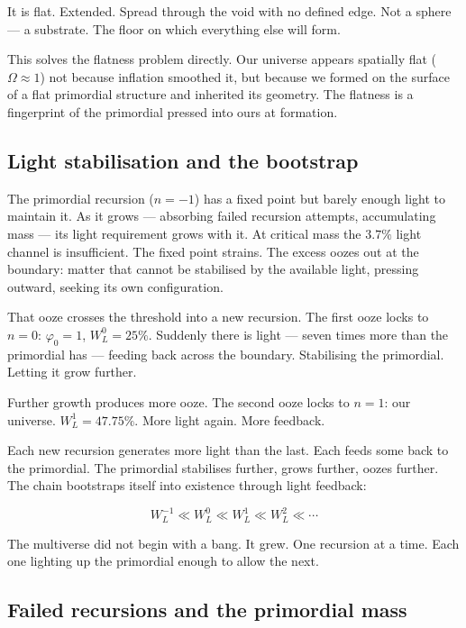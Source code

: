 \documentclass[prd,twocolumn,preprintnumbers,amsmath,amssymb]{revtex4-2}
\begin{document}
It is flat. Extended. Spread through the void with no defined edge.
Not a sphere --- a substrate. The floor on which everything else
will form.

This solves the flatness problem directly. Our universe appears
spatially flat ($\Omega \approx 1$) not because inflation smoothed
it, but because we formed on the surface of a flat primordial
structure and inherited its geometry. The flatness is a fingerprint
of the primordial pressed into ours at formation.

\subsection{Light stabilisation and the bootstrap}

The primordial recursion ($n=-1$) has a fixed point but barely
enough light to maintain it. As it grows --- absorbing failed
recursion attempts, accumulating mass --- its light requirement
grows with it. At critical mass the $3.7\%$ light channel is
insufficient. The fixed point strains. The excess oozes out at
the boundary: matter that cannot be stabilised by the available
light, pressing outward, seeking its own configuration.

That ooze crosses the threshold into a new recursion. The first
ooze locks to $n=0$: $\varphi_0 = 1$, $W_L^0 = 25\%$. Suddenly
there is light --- seven times more than the primordial has ---
feeding back across the boundary. Stabilising the primordial.
Letting it grow further.

Further growth produces more ooze. The second ooze locks to $n=1$:
our universe. $W_L^1 = 47.75\%$. More light again. More feedback.

Each new recursion generates more light than the last. Each feeds
some back to the primordial. The primordial stabilises further,
grows further, oozes further. The chain bootstraps itself into
existence through light feedback:

\begin{equation}
  W_L^{-1} \ll W_L^0 \ll W_L^1 \ll W_L^2 \ll \cdots
\end{equation}

The multiverse did not begin with a bang. It grew. One recursion
at a time. Each one lighting up the primordial enough to allow
the next.

\subsection{Failed recursions and the primordial mass}
\end{document}
